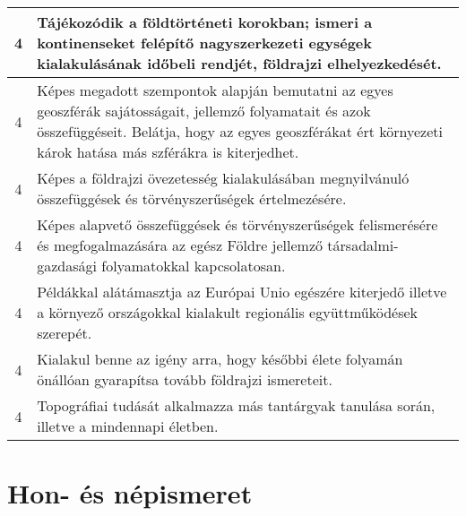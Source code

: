 \begin{longtable}{c | p{} }
                                
                                          4 &  Tájékozódik a földtörténeti korokban; ismeri a kontinenseket felépítő nagyszerkezeti egységek kialakulásának időbeli rendjét, földrajzi elhelyezkedését. \\ \hline
                                          4 &  Képes megadott szempontok alapján bemutatni az egyes geoszférák sajátosságait, jellemző folyamatait és azok összefüggéseit. Belátja, hogy az egyes geoszférákat ért környezeti károk hatása más szférákra is kiterjedhet. \\ \hline
                                          4 &  Képes a földrajzi övezetesség kialakulásában megnyilvánuló összefüggések és törvényszerűségek értelmezésére. \\ \hline
                                          4 &  Képes alapvető összefüggések és törvényszerűségek felismerésére és megfogalmazására az egész Földre jellemző társadalmi-gazdasági folyamatokkal kapcsolatosan. \\ \hline
                                          4 &  Példákkal alátámasztja az Európai Unio egészére kiterjedő illetve a környező országokkal kialakult regionális együttműködések szerepét. \\ \hline
                                          4 &  Kialakul benne az igény arra, hogy későbbi élete folyamán önállóan gyarapítsa tovább földrajzi ismereteit. \\ \hline
                                          4 &  Topográfiai tudását alkalmazza más tantárgyak tanulása során, illetve a mindennapi életben. \\ \hline
                                      
                        \end{longtable}
            \clearpage

        \section{Hon- és népismeret}

